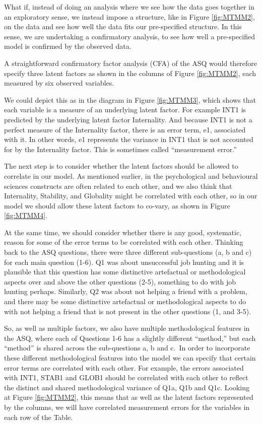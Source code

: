 \documentclass[
]{book}
\begin{document}
What if, instead of doing an analysis where we see how the data goes together in an exploratory sense, we instead impose a structure, like in Figure \ref{fig:MTMM2}, on the data and see how well the data fits our pre-specified structure. In this sense, we are undertaking a confirmatory analysis, to see how well a pre-specified model is confirmed by the observed data.

A straightforward confirmatory factor analysis (CFA) of the ASQ would therefore specify three latent factors as shown in the columns of Figure \ref{fig:MTMM2}, each measured by six observed variables.

We could depict this as in the diagram in Figure \ref{fig:MTMM3}, which shows that each variable is a measure of an underlying latent factor. For example INT1 is predicted by the underlying latent factor Internality. And because INT1 is not a perfect measure of the Internality factor, there is an error term, e1, associated with it. In other words, e1 represents the variance in INT1 that is not accounted for by the Internality factor. This is sometimes called ``measurement error.''

The next step is to consider whether the latent factors should be allowed to correlate in our model. As mentioned earlier, in the psychological and behavioural sciences constructs are often related to each other, and we also think that Internality, Stability, and Globality might be correlated with each other, so in our model we should allow these latent factors to co-vary, as shown in Figure \ref{fig:MTMM4}.

At the same time, we should consider whether there is any good, systematic, reason for some of the error terms to be correlated with each other. Thinking back to the ASQ questions, there were three different sub-questions (a, b and c) for each main question (1-6). Q1 was about unsuccessful job hunting and it is plausible that this question has some distinctive artefactual or methodological aspects over and above the other questions (2-5), something to do with job hunting perhaps. Similarly, Q2 was about not helping a friend with a problem, and there may be some distinctive artefactual or methodological aspects to do with not helping a friend that is not present in the other questions (1, and 3-5).

So, as well as multiple factors, we also have multiple methodological features in the ASQ, where each of Questions 1-6 has a slightly different ``method,'' but each ``method'' is shared across the sub-questions a, b and c.~In order to incorporate these different methodological features into the model we can specify that certain error terms are correlated with each other. For example, the errors associated with INT1, STAB1 and GLOB1 should be correlated with each other to reflect the distinct and shared methodological variance of Q1a, Q1b and Q1c. Looking at Figure \ref{fig:MTMM2}, this means that as well as the latent factors represented by the columns, we will have correlated measurement errors for the variables in each row of the Table.
\end{document}
